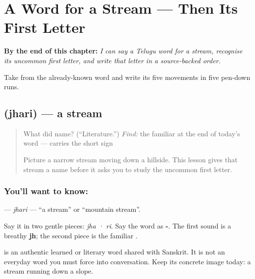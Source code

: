
\chapter{A Word for a Stream — Then Its First Letter}
\label{ch:te-jhari-jha}

\begin{chapteropening}
\textbf{By the end of this chapter:} \emph{I can say a Telugu word for a stream, recognise its uncommon first letter, and write that letter in a source-backed order.}

Take  from the already-known word  and write its five movements in five pen-down runs.
\end{chapteropening}

\section[\texorpdfstring{\te{ఝరి} (jhari)}{ఝరి (jhari)}]{ (jhari) — a stream}

\label{lesson:TE-C152-jhari}



\begin{quote}
What did \textbf{} name? (\textquotedblleft{}Literature.\textquotedblright{}) \emph{Find:} the familiar \textbf{} at the end of today's word — \textbf{} carries the short \textbf{} sign

Picture a narrow stream moving down a hillside. This lesson gives that stream a name before it asks you to study the uncommon first letter.
\end{quote}

\subsection*{You'll want to know: }
\textbf{} — \emph{jhari} — \textquotedblleft{}a stream\textquotedblright{} or \textquotedblleft{}mountain stream\textquotedblright{}.

Say it in two gentle pieces: \emph{jha · ri}. Say the word as \textbf{-}. The first sound is a breathy \textbf{jh}; the second piece is the familiar \textbf{}.

\textbf{} is an authentic learned or literary word shared with Sanskrit. It is not an everyday word you must force into conversation. Keep its concrete image today: a stream running down a slope.

